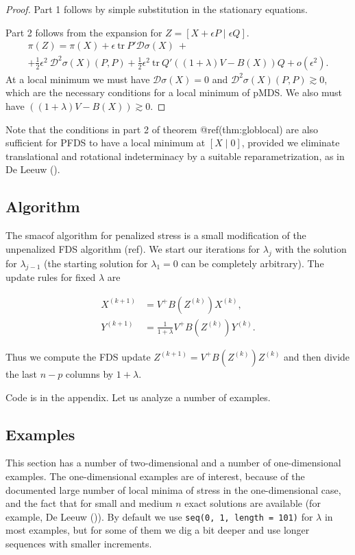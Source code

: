 \documentclass[
  12pt,
  letterpaper,
  DIV=11,
  numbers=noendperiod]{scrreprt}
\theoremstyle{remark}
\begin{document}
\begin{proof}
Part 1 follows by simple substitution in the stationary equations.

Part 2 follows from the expansion for
\(Z=[X+\epsilon P\mid\epsilon Q]\). \begin{multline}\label{E:expand2}
\pi(Z)=\pi(X)+\epsilon\ \text{tr}\ P'\mathcal{D}\sigma(X)\ +\\+\frac12\epsilon^2\ \mathcal{D}^2\sigma(X)(P,P)+\frac12\epsilon^2\ \text{tr}\ Q'((1+\lambda)V-B(X))Q+o(\epsilon^2).
\end{multline} At a local minimum we must have
\(\mathcal{D}\sigma(X)=0\) and \(\mathcal{D}^2\sigma(X)(P,P)\gtrsim 0\),
which are the necessary conditions for a local minimum of pMDS. We also
must have \(((1+\lambda)V-B(X))\gtrsim 0\).
\end{proof}

Note that the conditions in part 2 of theorem @ref(thm:globlocal) are
also sufficient for PFDS to have a local minimum at \([X\mid 0]\),
provided we eliminate translational and rotational indeterminacy by a
suitable reparametrization, as in De Leeuw
().

\subsection{Algorithm}\label{algorithm}

The smacof algorithm for penalized stress is a small modification of the
unpenalized FDS algorithm (ref). We start our iterations for
\(\lambda_j\) with the solution for \(\lambda_{j-1}\) (the starting
solution for \(\lambda_1=0\) can be completely arbitrary). The update
rules for fixed \(\lambda\) are

\begin{align}
X^{(k+1)}&=V^+B(Z^{(k)})X^{(k)},\\
Y^{(k+1)}&=\frac{1}{1+\lambda}V^+B(Z^{(k)})Y^{(k)}.
\end{align}

Thus we compute the FDS update \(Z^{(k+1)}=V^+B(Z^{(k)})Z^{(k)}\) and
then divide the last \(n-p\) columns by \(1+\lambda\).

Code is in the appendix. Let us analyze a number of examples.

\subsection{Examples}\label{examples-4}

This section has a number of two-dimensional and a number of
one-dimensional examples. The one-dimensional examples are of interest,
because of the documented large number of local minima of stress in the
one-dimensional case, and the fact that for small and medium \(n\) exact
solutions are available (for example, De Leeuw
()). By default we use
\texttt{seq(0,\ 1,\ length\ =\ 101)} for \(\lambda\) in most examples,
but for some of them we dig a bit deeper and use longer sequences with
smaller increments.
\end{document}
